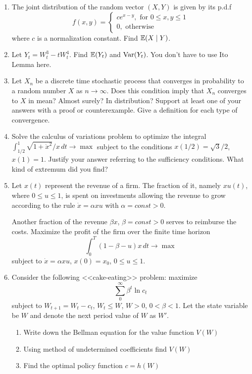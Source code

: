 \documentclass[12pt, a4paper]{article}
\begin{document}
\begin{enumerate}
\item  The joint distribution of the random vector $(X,Y)$ is given by its p.d.f
\[
f(x,y)=
\left\{
  \begin{array}{l}
    c e^{x-y}, \text{ for } 0\leq x,y\leq 1 \\
    0, \text{ otherwise}
  \end{array}
\right.
\]
where $c$ is a normalization constant. Find $\mathbb{E}(X\mid Y)$.

\item Let $Y_t=W_t^3-tW_t^4$. Find $\mathbb{E}(Y_t)$ and $\operatorname{Var}(Y_t)$.  You don’t have to use Ito Lemma here.
\item Let $X_n$ be a discrete time stochastic process that converges in probability to a random number $X$ as $n\to \infty$. Does this condition imply that $X_n$ converges to $X$ in mean? Almost surely? In distribution? Support at least one of your answers with a proof or counterexample. Give a definition for each type of convergence.

\item Solve the calculus of variations problem to optimize the integral
$ \int_{1/2}^1 \sqrt{1+\dot{x}^2}/x\,dt \to \max $
subject to the conditions $x(1/2)=\sqrt{3}/2$, $x(1)=1$. Justify your answer referring to the sufficiency conditions. What kind of extremum did you find?

\item Let $x(t)$ represent the revenue of a firm. The fraction of it, namely $xu(t)$, where $0\leq u\leq 1$, is spent on investments allowing the revenue to grow according to the rule $\dot{x}=\alpha x u$ with $\alpha=const>0$.

Another fraction of the revenue $\beta x$, $\beta=const>0$ serves to reimburse the costs. Maximize the profit of the firm over the finite time horizon
\[
\int_0^T (1-\beta-u)x\, dt \to \max
\]
subject to $\dot{x}=\alpha x u$, $x(0)=x_0$, $0\leq u\leq 1$.

\item Consider the following <<cake-eating>> problem: maximize
\[
\sum_0^{\infty} \beta^t \ln c_t
\]
subject to $W_{t+1}=W_t-c_t$, $W_t\leq W$, $W>0$, $0<\beta<1$. Let the state variable be $W$ and denote the next period value of $W$ as $W'$.
\begin{enumerate}
\item Write down the Bellman equation for the value function $V(W)$
\item Using method of undetermined coefficients find $V(W)$
\item Find the optimal policy function $c=h(W)$
\end{enumerate}

\end{enumerate}
\end{document}
